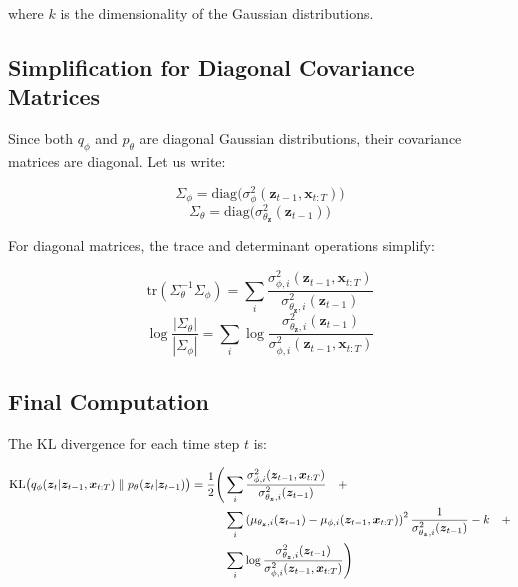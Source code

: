 where $k$ is the dimensionality of the Gaussian distributions.

\subsection*{Simplification for Diagonal Covariance Matrices}

Since both $q_\phi$ and $p_\theta$ are diagonal Gaussian distributions,
their covariance matrices are diagonal. Let us write:

\begin{equation*}
\Sigma_{\phi} = \text{diag}\big(\sigma^2_{\phi}(\bm{z}_{t-1}, 
\bm{x}_{t:T})\big)
\end{equation*}
\begin{equation*}
\Sigma_{\theta} = \text{diag}\big(\sigma^2_{\theta_{\bm{z}}}
(\bm{z}_{t-1})\big)
\end{equation*}

For diagonal matrices, the trace and determinant operations simplify:

\begin{equation*}
\text{tr}(\Sigma_{\theta}^{-1} \Sigma_{\phi}) = \sum_{i} 
\frac{\sigma^2_{\phi, i}(\bm{z}_{t-1}, \bm{x}_{t:T})}
{\sigma^2_{\theta_{\bm{z}}, i}(\bm{z}_{t-1})}
\end{equation*}
\begin{equation*}
\log \frac{|\Sigma_{\theta}|}{|\Sigma_{\phi}|} = 
\sum_{i} \log \frac{\sigma^2_{\theta_{\bm{z}}, i}(\bm{z}_{t-1})}
{\sigma^2_{\phi, i}(\bm{z}_{t-1}, \bm{x}_{t:T})}
\end{equation*}

\subsection*{Final Computation}

The KL divergence for each time step $t$ is:

\begin{align*}
\mathrm{KL}\big( q_\phi(\bm{z}_t | \bm{z}_{t-1}, \bm{x}_{t:T}) 
\parallel p_\theta(\bm{z}_t | \bm{z}_{t-1}) \big) = 
\frac{1}{2} \Bigg(& 
    \sum_{i} \frac{\sigma^2_{\phi, i}(\bm{z}_{t-1}, \bm{x}_{t:T})}
    {\sigma^2_{\theta_{\bm{z}}, i}(\bm{z}_{t-1})} \quad + \\
    & \sum_{i} \left( \mu_{\theta_{\bm{z}}, i}(\bm{z}_{t-1}) - 
    \mu_{\phi, i}(\bm{z}_{t-1}, \bm{x}_{t:T}) \right)^2 \frac{1}
    {\sigma^2_{\theta_{\bm{z}}, i}(\bm{z}_{t-1})} - k \quad + \\
    & \sum_{i} \log \frac{\sigma^2_{\theta_{\bm{z}}, i}(\bm{z}_{t-1})}
    {\sigma^2_{\phi, i}(\bm{z}_{t-1}, \bm{x}_{t:T})} \Bigg)
\end{align*}

